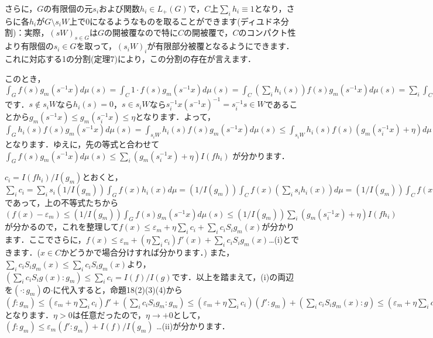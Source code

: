さらに，$G$の有限個の元$s_{i}$および関数$h_i \in L_{+}(G)$で，$C$上$\sum_{i}h_i \equiv 1$となり，さらに各$h_i$が$G \setminus s_{i}W$上で0になるようなものを取ることができます(ディユドネ分割)：実際，$(sW)_{s \in G}$は$G$の開被覆なので特に$C$の開被覆で，$C$のコンパクト性より有限個の$s_i \in G$を取って，$(s_{i}W)_{i}$が有限部分被覆となるようにできます．これに対応する1の分割(定理7)により，この分割の存在が言えます．

このとき，$\int_{G}f(s)g_{m}(s^{-1}x)d\mu(s)=\int_{C}1 \cdot f(s)g_{m}(s^{-1}x)d\mu(s)=\int_{C} \left( \sum_{i}h_{i}(s) \right) f(s)g_{m}(s^{-1}x)d\mu(s)=\sum_{i} \int_{C}h_{i}(s)f(s)g_{m}(s^{-1}x)d\mu(s)=\sum_{i} \int_{G}h_{i}(s)f(s)g_{m}(s^{-1}x)d\mu(s)$です．$s \not\in s_{i}W$なら$h_{i}(s)=0$，$s \in s_{i}W$なら$s_{i}^{-1}x(s^{-1}x)^{-1}=s_{i}^{-1}s \in W$であることから$g_{m}(s^{-1}x) \le g_{m}(s_{i}^{-1}x) \le \eta$となります．よって， $\int_{G}h_{i}(s)f(s)g_{m}(s^{-1}x)d\mu(s)=\int_{s_{i}W}h_{i}(s)f(s)g_{m}(s^{-1}x)d\mu(s) \le \int_{s_{i}W}h_{i}(s)f(s)\left( g_{m}(s_{i}^{-1}x) + \eta \right) d\mu(s)=\left( g_{m}(s_{i}^{-1}x) + \eta \right) \int_{G}h_{i}(s)f(s)d\mu(s)=\left( g_{m}(s_{i}^{-1}x) + \eta \right)I(fh_{i})$となります．ゆえに，先の等式と合わせて$\int_{G}f(s)g_{m}(s^{-1}x)d\mu(s) \le \sum_{i}\left( g_{m}(s_{i}^{-1}x) + \eta \right)I(fh_{i})$ が分かります．

$c_i=I(fh_i)/I(g_{m})$とおくと，$\sum_{i}c_{i}=\sum_{i}s_{i}\left( 1/I(g_{m}) \right) \int_{G}f(x)h_{i}(x)d\mu=\left( 1/I(g_{m}) \right) \int_{C}f(x) \left( \sum_{i}s_{i}h_{i}(x) \right) d\mu=\left( 1/I(g_{m}) \right) \int_{C}f(x) d\mu=\left( 1/I(g_{m}) \right) \int_{G}f(x) d\mu=I(f)/I(g_{m})$であって，上の不等式たちから $(f(x)-\varepsilon_{m}) \le \left( 1/I(g_{m}) \right)\int_{G}f(s)g_{m}(s^{-1}x)d\mu(s) \le \left( 1/I(g_{m}) \right) \sum_{i}\left( g_{m}(s_{i}^{-1}x) + \eta \right)I(fh_{i})$が分かるので，これを整理して$f(x) \le \varepsilon_{m} + \eta \sum_{i}c_{i} + \sum_{i}c_{i}S_{i}g_{m}(x)$が分かります．ここでさらに，$f(x) \le \varepsilon_{m} + \left( \eta \sum_{i}c_{i} \right)f'(x) + \sum_{i}c_{i}S_{i}g_{m}(x)$…(i)とできます．($x \in C$かどうかで場合分けすれば分かります．) また，$\sum_{i}c_{i}S_{i}g_{m}(x) \le \sum_{i}c_{i}S_{i}g_{m}(x)$より， $\left( \sum_{i}c_{i}S_{i}g(x) \colon g_{m} \right) \le \sum_{i}c_{i}=I(f)/I(g)$です．以上を踏まえて，(i)の両辺を$\left( \cdot \colon g_{m} \right) $の$\cdot$に代入すると，命題18(2)(3)(4)から $\left( f \colon g_{m} \right) \le \left( \varepsilon_{m} + \eta \sum_{i}c_{i} \right)f' + \left( \sum_{i}c_{i}S_{i}g_{m} \colon g_{m} \right) \le \left( \varepsilon_{m} + \eta \sum_{i}c_{i} \right) \left( f' \colon g_{m} \right) + \left( \sum_{i}c_{i}S_{i}g_{m}(x) \colon g \right) \le \left( \varepsilon_{m} + \eta \sum_{i}c_{i} \right) \left( f' \colon g_{m} \right) + I(f)/I(g_{m})$ となります．$\eta>0$は任意だったので，$\eta \to +0$として，$\left( f \colon g_{m} \right) \le \varepsilon_{m} \left( f' \colon g_{m} \right) + I(f)/I(g_{m})$ …(ii)が分かります．

